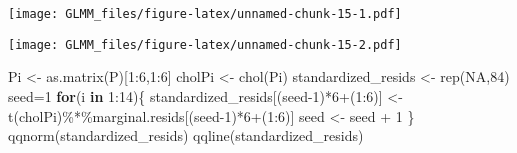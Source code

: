 \documentclass[
]{book}
\newenvironment{Shaded}{\begin{snugshade}}{\end{snugshade}}
\newcommand{\AttributeTok}[1]{\textcolor[rgb]{0.77,0.63,0.00}{#1}}
\newcommand{\ConstantTok}[1]{\textcolor[rgb]{0.00,0.00,0.00}{#1}}
\newcommand{\ControlFlowTok}[1]{\textcolor[rgb]{0.13,0.29,0.53}{\textbf{#1}}}
\newcommand{\DecValTok}[1]{\textcolor[rgb]{0.00,0.00,0.81}{#1}}
\newcommand{\FunctionTok}[1]{\textcolor[rgb]{0.00,0.00,0.00}{#1}}
\newcommand{\NormalTok}[1]{#1}
\newcommand{\OtherTok}[1]{\textcolor[rgb]{0.56,0.35,0.01}{#1}}
\newcommand{\SpecialCharTok}[1]{\textcolor[rgb]{0.00,0.00,0.00}{#1}}
\newcommand{\StringTok}[1]{\textcolor[rgb]{0.31,0.60,0.02}{#1}}
\begin{document}
\texttt{[image: GLMM\_files/figure-latex/unnamed-chunk-15-1.pdf]}

\begin{Shaded}
\end{Shaded}

\texttt{[image: GLMM\_files/figure-latex/unnamed-chunk-15-2.pdf]}

\begin{Shaded}
\begin{Highlighting}[]
\NormalTok{Pi }\OtherTok{\textless{}{-}} \FunctionTok{as.matrix}\NormalTok{(P)[}\DecValTok{1}\SpecialCharTok{:}\DecValTok{6}\NormalTok{,}\DecValTok{1}\SpecialCharTok{:}\DecValTok{6}\NormalTok{]}
\NormalTok{cholPi }\OtherTok{\textless{}{-}} \FunctionTok{chol}\NormalTok{(Pi)}
\NormalTok{standardized\_resids }\OtherTok{\textless{}{-}} \FunctionTok{rep}\NormalTok{(}\ConstantTok{NA}\NormalTok{,}\DecValTok{84}\NormalTok{)}
\NormalTok{seed}\OtherTok{=}\DecValTok{1}
\ControlFlowTok{for}\NormalTok{(i }\ControlFlowTok{in} \DecValTok{1}\SpecialCharTok{:}\DecValTok{14}\NormalTok{)\{}
\NormalTok{  standardized\_resids[(seed}\DecValTok{{-}1}\NormalTok{)}\SpecialCharTok{*}\DecValTok{6}\SpecialCharTok{+}\NormalTok{(}\DecValTok{1}\SpecialCharTok{:}\DecValTok{6}\NormalTok{)] }\OtherTok{\textless{}{-}} \FunctionTok{t}\NormalTok{(cholPi)}\SpecialCharTok{\%*\%}\NormalTok{marginal.resids[(seed}\DecValTok{{-}1}\NormalTok{)}\SpecialCharTok{*}\DecValTok{6}\SpecialCharTok{+}\NormalTok{(}\DecValTok{1}\SpecialCharTok{:}\DecValTok{6}\NormalTok{)]}
\NormalTok{  seed }\OtherTok{\textless{}{-}}\NormalTok{ seed }\SpecialCharTok{+} \DecValTok{1}
\NormalTok{\}}
\FunctionTok{qqnorm}\NormalTok{(standardized\_resids)}
\FunctionTok{qqline}\NormalTok{(standardized\_resids)}
\end{Highlighting}
\end{Shaded}
\end{document}
